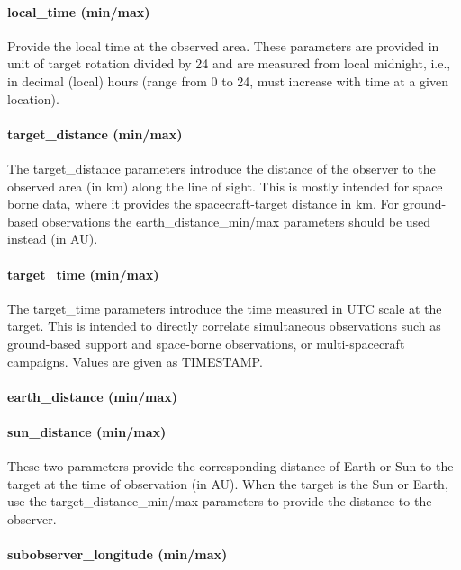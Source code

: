 \documentclass[11pt,a4paper]{ivoa}
\begin{document}
\paragraph{local\_time (min/max)}

Provide the local time at the observed area. These parameters are
provided in unit of target rotation divided by 24 and are measured from
local midnight, i.e., in decimal (local) hours (range from 0 to 24,
must increase with time at a given location).

\paragraph{target\_distance (min/max)}

The target\_distance parameters introduce the distance of the observer
to the observed area (in km) along the line of sight. This is mostly
intended for space borne data, where it provides the spacecraft-target
distance in km. For ground-based observations the earth\_distance\_min/max
parameters should be used instead (in AU).

\paragraph{target\_time (min/max)}

The target\_time parameters introduce the time measured in UTC scale
at the target. This is intended to directly correlate simultaneous
observations such as ground-based support and space-borne observations,
or multi-spacecraft campaigns. Values are given as TIMESTAMP.

\paragraph{earth\_distance (min/max)}

\paragraph{sun\_distance (min/max)}
\vspace{-15pt}
These two parameters provide the corresponding distance of Earth or Sun
to the target at the time of observation (in AU). When the target is the
Sun or Earth, use the target\_distance\_min/max parameters to provide
the distance to the observer.

\paragraph{subobserver\_longitude (min/max)}
\end{document}
